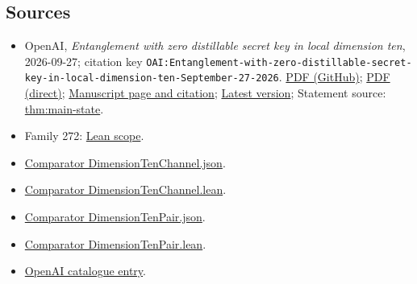 \documentclass[11pt]{article}
\begin{document}
\subsection{Sources}
\begin{itemize}
\item OpenAI, \emph{Entanglement with zero distillable secret key in local dimension ten}, 2026-09-27; citation key \texttt{OAI:Entanglement-with-zero-distillable-secret-key-in-local-dimension-ten-September-27-2026}. \href{https://github.com/openai/math/blob/adc7f1241b42e322a6451854ab7e4b4c146bf78a/preprints/Entanglement-with-zero-distillable-secret-key-in-local-dimension-ten-September-27-2026/paper.pdf}{PDF (GitHub)}; \href{https://github.com/openai/math/raw/adc7f1241b42e322a6451854ab7e4b4c146bf78a/preprints/Entanglement-with-zero-distillable-secret-key-in-local-dimension-ten-September-27-2026/paper.pdf}{PDF (direct)}; \href{https://github.com/openai/math/blob/adc7f1241b42e322a6451854ab7e4b4c146bf78a/preprints/Entanglement-with-zero-distillable-secret-key-in-local-dimension-ten-September-27-2026/README.md}{Manuscript page and citation}; \href{https://github.com/openai/math/blob/main/preprints/Entanglement-with-zero-distillable-secret-key-in-local-dimension-ten-September-27-2026/paper.pdf}{Latest version}; Statement source: \href{https://github.com/openai/math/blob/adc7f1241b42e322a6451854ab7e4b4c146bf78a/preprints/Entanglement-with-zero-distillable-secret-key-in-local-dimension-ten-September-27-2026/build/source/sections/introduction.tex\#L45}{thm:main-state}.
\item Family 272: \href{https://github.com/openai/math/blob/adc7f1241b42e322a6451854ab7e4b4c146bf78a/lean/docs/272.md}{Lean scope}.
\item \href{https://github.com/openai/math/blob/adc7f1241b42e322a6451854ab7e4b4c146bf78a/lean/ComparatorChallenges/DimensionTenChannel.json}{Comparator DimensionTenChannel.json}.
\item \href{https://github.com/openai/math/blob/adc7f1241b42e322a6451854ab7e4b4c146bf78a/lean/ComparatorChallenges/DimensionTenChannel.lean}{Comparator DimensionTenChannel.lean}.
\item \href{https://github.com/openai/math/blob/adc7f1241b42e322a6451854ab7e4b4c146bf78a/lean/ComparatorChallenges/DimensionTenPair.json}{Comparator DimensionTenPair.json}.
\item \href{https://github.com/openai/math/blob/adc7f1241b42e322a6451854ab7e4b4c146bf78a/lean/ComparatorChallenges/DimensionTenPair.lean}{Comparator DimensionTenPair.lean}.
\item \href{https://github.com/openai/math/blob/adc7f1241b42e322a6451854ab7e4b4c146bf78a/CONTENTS.md}{OpenAI catalogue entry}.
\end{itemize}
\end{document}
